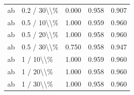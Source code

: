 \begin{table}[!h]
\begin{tabular}[t]{llccc}
\addlinespace
ab & 0.2 / 30\textbackslash{}\textbackslash{}\% & 0.000 & 0.958 & 0.907\\
ab & 0.5 / 10\textbackslash{}\textbackslash{}\% & 1.000 & 0.959 & 0.960\\
ab & 0.5 / 20\textbackslash{}\textbackslash{}\% & 1.000 & 0.958 & 0.960\\
ab & 0.5 / 30\textbackslash{}\textbackslash{}\% & 0.750 & 0.958 & 0.947\\
ab & 1 / 10\textbackslash{}\textbackslash{}\% & 1.000 & 0.959 & 0.960\\
\addlinespace
ab & 1 / 20\textbackslash{}\textbackslash{}\% & 1.000 & 0.958 & 0.960\\
ab & 1 / 30\textbackslash{}\textbackslash{}\% & 1.000 & 0.958 & 0.960\\
\bottomrule
\end{tabular}
\end{table}
